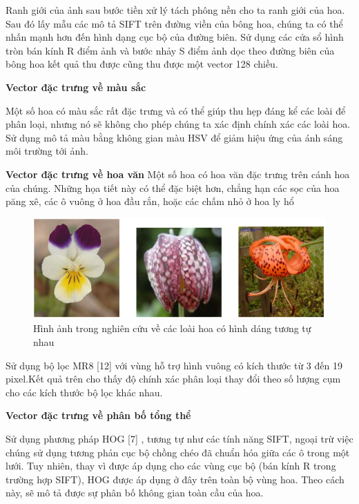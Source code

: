 \documentclass[12pt]{report}
\begin{document}
		Ranh giới của ảnh sau bước tiền xử lý tách phông nền cho ta ranh giới của hoa. Sau đó lấy mẫu các mô tả SIFT trên đường viền của bông hoa, chúng ta có thể nhấn mạnh hơn đến hình dạng cục bộ của đường biên. Sử dụng các cửa sổ hình tròn bán kính R điểm ảnh và bước nhảy S điểm ảnh dọc theo đường biên của bông hoa kết quả thu được cũng thu được một vector 128 chiều.							
																																								
																														
		\textbf{Vector đặc trưng về màu sắc}
																												
		Một số hoa có màu sắc rất đặc trưng và có thể giúp thu hẹp đáng kể các loài để phân loại, nhưng nó sẽ không cho phép chúng ta xác định chính xác các loài hoa. Sử dụng mô tả màu bằng không gian màu HSV để giảm hiệu ứng của ánh sáng môi trường tới ảnh.
																										
		\textbf{Vector đặc trưng về hoa văn}
		Một số hoa có hoa văn đặc trưng trên cánh hoa của chúng. Những họa tiết này có thể đặc biệt hơn, chẳng hạn các sọc của hoa păng xê, các ô vuông ở hoa đầu rắn, hoặc các chấm nhỏ ở hoa ly hổ
		\begin{figure}[h]
			\centering
			\includegraphics[scale=0.5]{anh_hoa_cau_truc}
			\caption{Hình ảnh trong nghiên cứu \cite{cia-Nilsback06} về các loài hoa có hình dáng tương tự nhau}
			\label{fig:anh_hoa_cau_truc}
		\end{figure}
																								
		Sử dụng bộ lọc MR8 [12] với vùng hỗ trợ hình vuông có kích thước từ 3 đến 19 pixel.Kết quả trên cho thấy độ chính xác phân loại thay đổi theo số lượng cụm cho các kích thước bộ lọc khác nhau.
																								
		\textbf{Vector đặc trưng về phân bố tổng thể}
																								
		Sử dụng phương pháp HOG [7] , tương tự như các tính năng SIFT, ngoại trừ việc chúng sử dụng tương phản cục bộ chồng chéo đã chuẩn hóa giữa các ô trong một lưới. Tuy nhiên, thay vì được áp dụng cho các vùng cục bộ (bán kính R trong trường hợp SIFT), HOG được áp dụng ở đây trên toàn bộ vùng hoa. Theo cách này, sẽ mô tả được sự phân bố không gian toàn cầu của hoa.
																								
\end{document}

